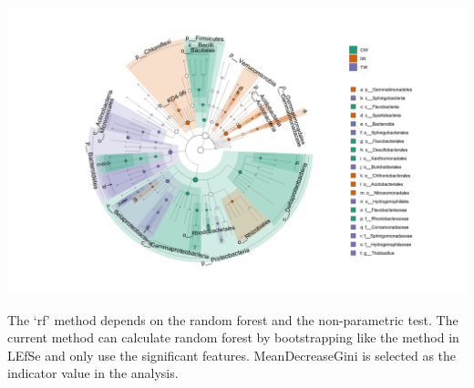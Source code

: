 \documentclass[
]{book}
\begin{document}
\begin{center}\includegraphics[width=1000px]{Images/plot_lefse_cladogram_1} \end{center}

The `rf' method depends on the random forest\citep{Beck_Machine_2014, Yatsunenko_Human_2012} and the non-parametric test.
The current method can calculate random forest by bootstrapping like the method in LEfSe and only use the significant features.
MeanDecreaseGini is selected as the indicator value in the analysis.
\end{document}

